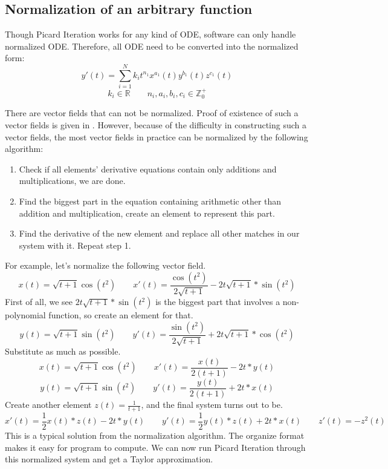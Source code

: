 \documentclass[12pt]{article}
\begin{document}
\subsection{Normalization of an arbitrary function}

Though Picard Iteration works for any kind of ODE, software can only handle normalized ODE. Therefore, all ODE need to be converted into the normalized form:
$$
y'(t) = \sum^N_{i=1} k_{i} t^{n_{1}} x^{a_{1}}(t) y^{b_{1}}(t) z^{c_{1}}(t) 
$$
$$
k_i \in \mathbb{R} \qquad n_i, a_i, b_i, c_i \in \mathbb{Z}^+_0
$$

There are vector fields that can not be normalized. Proof of existence of such a vector fields is given in \cite{CPSW}. However, because of the difficulty in constructing such a vector fields, the most vector fields in practice can be normalized by the following algorithm:
\begin{enumerate}
\item Check if all elements' derivative equations contain only additions and multiplications, we are done.
\item Find the biggest part in the equation containing arithmetic other than addition and multiplication, create an element to represent this part.
\item Find the derivative of the new element and replace all other matches in our system with it. Repeat step 1.
\end{enumerate}
For example, let's normalize the following vector field.
\begin{equation}
x(t) = \sqrt{t+1}\cos(t^2)  \qquad
x'(t) = \frac{\cos(t^2)}{2\sqrt{t+1}} - 2t\sqrt{t+1}*\sin(t^2)
\end{equation}
First of all, we see $2t\sqrt{t+1}*\sin(t^2)$ is the biggest part that involves a non-polynomial function, so create an element for that. 
\begin{equation}
y(t) = \sqrt{t+1}\sin(t^2)  \qquad
y'(t) = \frac{\sin(t^2)}{2\sqrt{t+1}} + 2t\sqrt{t+1}*\cos(t^2)
\end{equation}
Substitute as much as possible.
\begin{equation}
x(t) = \sqrt{t+1}\cos(t^2)  \qquad
x'(t) = \frac{x(t)}{2(t+1)} - 2t*y(t)
\end{equation}
\begin{equation}
y(t) = \sqrt{t+1}\sin(t^2)  \qquad
y'(t) = \frac{y(t)}{2(t+1)} + 2t*x(t)
\end{equation}
Create another element $z(t) = \frac{1}{t+1}$, and the final system turns out to be.
\begin{equation}
x'(t) = \frac{1}{2}x(t)*z(t) - 2t*y(t) \qquad
y'(t) = \frac{1}{2}y(t)*z(t) + 2t*x(t) \qquad
z'(t) = -z^{2}(t)
\end{equation}
This is a typical solution from the normalization algorithm. The organize format makes it easy for program to compute. We can now run Picard Iteration through this normalized system and get a Taylor approximation.
\end{document}
